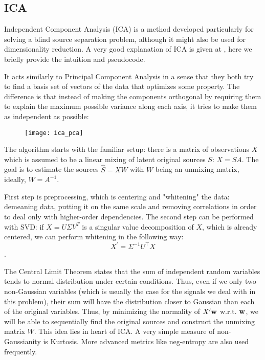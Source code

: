 \documentclass[../main.tex]{subfiles} %
\begin{document}
\subsection{ICA}

Independent Component Analysis (ICA) is a method developed particularly for solving a blind source separation problem, although it might also be used for dimensionality reduction. 
A very good explanation of ICA is given at \cite{ica}, here we briefly provide the intuition and pseudocode.

It acts similarly to Principal Component Analysis in a sense that they both try to find a basis set of vectors of the data that optimizes some property. 
The difference is that instead of making the components orthogonal by requiring them to explain the maximum possible variance along each axis, it tries to make them as independent as possible:

\begin{figure}[!h]
	\centering
	\texttt{[image: ica\_pca]}
\end{figure}

The algorithm starts with the familiar setup: there is a matrix of observations $X$ which is assumed to be a linear mixing of latent original sources $S$: $X = S A$. 
The goal is to estimate the sources $\hat S = X W$ with $W$ being an unmixing matrix, ideally, $W = A^{-1}$.

First step is preprocessing, which is centering and "whitening" the data: demeaning data, putting it on the same scale and removing correlations in order to deal only with higher-order dependencies.
The second step can be performed with SVD: if $X = U \Sigma V^T$ is a singular value decomposition of $X$, which is already centered, we can perform whitening in the following way: \[X^\prime = \Sigma^{-1} U^\top  X\].

The Central Limit Theorem states that the sum of independent random variables tends to normal distribution under certain conditions. 
Thus, even if we only two non-Gaussian variables (which is usually the case for the signals we deal with in this problem), their sum will have the distribution closer to Gaussian than each of the original variables. 
Thus, by minimizing the normality of $X^\prime {\mathbf w}$ w.r.t. ${\mathbf w}$, we will be able to sequentially find the original sources and construct the unmixing matrix $W$.
This idea lies in heart of ICA.
A very simple measure of non-Gaussianity is Kurtosis. 
More advanced metrics like neg-entropy are also used frequently.
\end{document}
